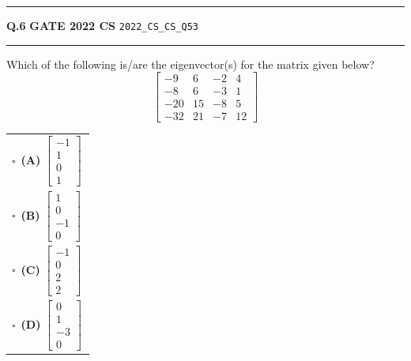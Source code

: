 \documentclass[a4paper,10pt]{article}
\begin{document}
\vspace{6pt}\hrule height 0.35pt\vspace{6pt}
\noindent
\begin{tcolorbox}[
    blanker,
    sidebyside,
    sidebyside align=top,
    lefthand width=0.55\textwidth,
    top=4pt, bottom=4pt, left=0pt, right=0pt,
    middle=16pt,
    underlay={
        \draw[dashed, black!80, line width=0.8pt, dash pattern=on 4pt off 3pt]
            ([xshift=0.55\textwidth+8pt]frame.north west) --
            ([xshift=0.55\textwidth+8pt]frame.south west);
    }
]
\textbf{Q.6}  \hfill {\footnotesize\textbf{GATE 2022 CS} \quad \tiny\texttt{2022\_CS\_CS\_Q53}}
\vspace{2pt}\hrule height 0.3pt\vspace{4pt}

Which of the following is/are the eigenvector(s) for the matrix given below?
\[ \begin{bmatrix} -9 & 6 & -2 & 4 \\ -8 & 6 & -3 & 1 \\ -20 & 15 & -8 & 5 \\ -32 & 21 & -7 & 12 \end{bmatrix} \]

\par\vspace{6pt}\noindent
\begin{tabular}{@{}p{0.98\linewidth}@{}}
$\square$\ \textbf{(A)} $\begin{bmatrix} -1 \\ 1 \\ 0 \\ 1 \end{bmatrix}$ \\
\addlinespace[3pt]
$\square$\ \textbf{(B)} $\begin{bmatrix} 1 \\ 0 \\ -1 \\ 0 \end{bmatrix}$ \\
\addlinespace[3pt]
$\square$\ \textbf{(C)} $\begin{bmatrix} -1 \\ 0 \\ 2 \\ 2 \end{bmatrix}$ \\
\addlinespace[3pt]
$\square$\ \textbf{(D)} $\begin{bmatrix} 0 \\ 1 \\ -3 \\ 0 \end{bmatrix}$
\end{tabular}


\end{tcolorbox}
\end{document}
